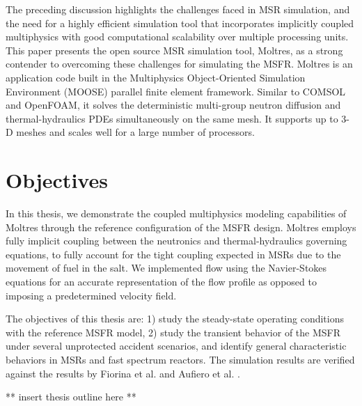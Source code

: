The preceding discussion highlights the challenges faced in MSR simulation,
and the need for a highly efficient simulation tool that incorporates
implicitly coupled multiphysics with good computational scalability over
multiple processing units. This paper presents the open source MSR simulation
tool, Moltres, as a strong contender to overcoming these challenges for
simulating the MSFR. Moltres is an application code
built in the Multiphysics Object-Oriented Simulation Environment (MOOSE)
parallel finite element framework. Similar to COMSOL and OpenFOAM, it solves
the deterministic multi-group neutron diffusion and thermal-hydraulics
\glspl{PDE} simultaneously on the same mesh. It supports up to 3-D meshes and
scales well for a large number of processors.

\section{Objectives}

In this thesis, we demonstrate the coupled multiphysics modeling capabilities
of Moltres through the reference configuration of the MSFR design. Moltres
employs fully implicit coupling between the neutronics and thermal-hydraulics
governing equations, to fully account for the tight coupling expected in MSRs
due to the movement of fuel in the salt. We implemented flow using the
Navier-Stokes equations for an accurate representation of the flow profile as
opposed to imposing a predetermined velocity field.

The objectives of this thesis are: 1) study the steady-state operating
conditions with the reference \gls{MSFR} model, 2) study the transient
behavior of the \gls{MSFR} under several unprotected accident scenarios, and
identify general characteristic behaviors in MSRs and fast spectrum reactors.
The simulation results are verified against the results by Fiorina et al.
\cite{fiorina_modelling_2014} and Aufiero et al.
\cite{aufiero_development_2014}.

** insert thesis outline here **